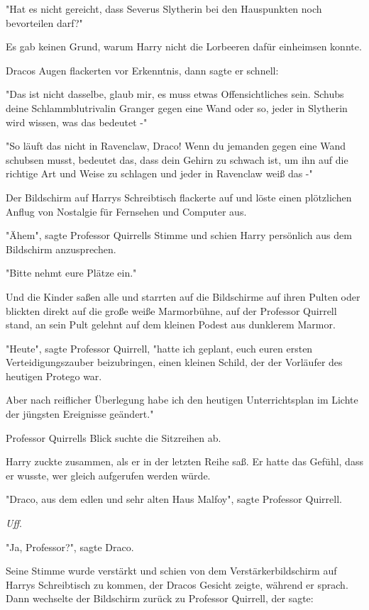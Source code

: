 {"Hat es nicht gereicht, dass Severus Slytherin bei den Hauspunkten noch bevorteilen darf?"

Es gab keinen Grund, warum Harry nicht die Lorbeeren dafür einheimsen konnte.

Dracos Augen flackerten vor Erkenntnis, dann sagte er schnell:

"Das ist nicht dasselbe, glaub mir, es muss etwas Offensichtliches sein. Schubs deine Schlammblutrivalin Granger gegen eine Wand oder so, jeder in Slytherin wird wissen, was das bedeutet -"

"So läuft das nicht in Ravenclaw, Draco! Wenn du jemanden gegen eine Wand schubsen musst, bedeutet das, dass dein Gehirn zu schwach ist, um ihn auf die richtige Art und Weise zu schlagen und jeder in Ravenclaw weiß das -"

Der Bildschirm auf Harrys Schreibtisch flackerte auf und löste einen plötzlichen Anflug von Nostalgie für Fernsehen und Computer aus.

"Ähem", sagte Professor Quirrells Stimme und schien Harry persönlich aus dem Bildschirm anzusprechen.

"Bitte nehmt eure Plätze ein."

Und die Kinder saßen alle und starrten auf die Bildschirme auf ihren Pulten oder blickten direkt auf die große weiße Marmorbühne, auf der Professor Quirrell stand, an sein Pult gelehnt auf dem kleinen Podest aus dunklerem Marmor.

"Heute", sagte Professor Quirrell, "hatte ich geplant, euch euren ersten Verteidigungszauber beizubringen, einen kleinen Schild, der der Vorläufer des heutigen Protego war.

Aber nach reiflicher Überlegung habe ich den heutigen Unterrichtsplan im Lichte der jüngsten Ereignisse geändert."

Professor Quirrells Blick suchte die Sitzreihen ab.

Harry zuckte zusammen, als er in der letzten Reihe saß. Er hatte das Gefühl, dass er wusste, wer gleich aufgerufen werden würde.

"Draco, aus dem edlen und sehr alten Haus Malfoy", sagte Professor Quirrell.

\emph{Uff}.

"Ja, Professor?", sagte Draco.

Seine Stimme wurde verstärkt und schien von dem Verstärkerbildschirm auf Harrys Schreibtisch zu kommen, der Dracos Gesicht zeigte, während er sprach. Dann wechselte der Bildschirm zurück zu Professor Quirrell, der sagte:

}
